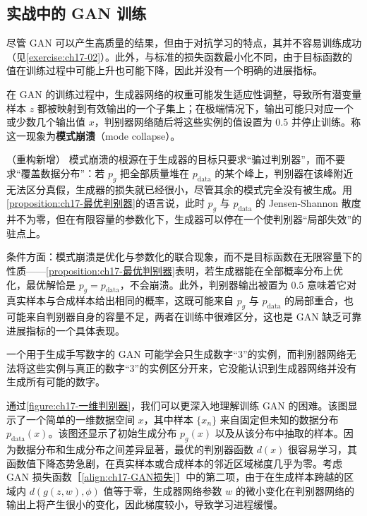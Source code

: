 \documentclass[../../main.tex]{subfiles}
\begin{document}
\subsection{实战中的 GAN 训练}\label{subsection:ch17-实战GAN训练}

尽管 GAN 可以产生高质量的结果，但由于对抗学习的特点，其并不容易训练成功（见\cref{exercise:ch17-02}）。此外，与标准的损失函数最小化不同，由于目标函数的值在训练过程中可能上升也可能下降，因此并没有一个明确的进展指标。

\begin{definition}[模式崩溃]\label{definition:ch17-模式崩溃}
在 GAN 的训练过程中，生成器网络的权重可能发生适应性调整，导致所有潜变量样本 $z$ 都被映射到有效输出的一个子集上；在极端情况下，输出可能只对应一个或少数几个输出值 $x$，判别器网络随后将这些实例的值设置为 $0.5$ 并停止训练。称这一现象为\textbf{模式崩溃}（mode collapse）。
\end{definition}

\begin{remark}（重构新增）
模式崩溃的根源在于生成器的目标只要求“骗过判别器”，而不要求“覆盖数据分布”：若 $p_g$ 把全部质量堆在 $p_{\mathrm{data}}$ 的某个峰上，判别器在该峰附近无法区分真假，生成器的损失就已经很小，尽管其余的模式完全没有被生成。用\cref{proposition:ch17-最优判别器}的语言说，此时 $p_g$ 与 $p_{\mathrm{data}}$ 的 Jensen-Shannon 散度并不为零，但在有限容量的参数化下，生成器可以停在一个使判别器“局部失效”的驻点上。

条件方面：模式崩溃是优化与参数化的联合现象，而不是目标函数在无限容量下的性质——\cref{proposition:ch17-最优判别器}表明，若生成器能在全部概率分布上优化，最优解恰是 $p_g=p_{\mathrm{data}}$，不会崩溃。此外，判别器输出被置为 $0.5$ 意味着它对真实样本与合成样本给出相同的概率，这既可能来自 $p_g$ 与 $p_{\mathrm{data}}$ 的局部重合，也可能来自判别器自身的容量不足，两者在训练中很难区分，这也是 GAN 缺乏可靠进展指标的一个具体表现。
\end{remark}

\begin{example}[ 手写数字生成中的模式崩溃]\label{example:ch17-模式崩溃}
一个用于生成手写数字的 GAN 可能学会只生成数字“3”的实例，而判别器网络无法将这些实例与真正的数字“3”的实例区分开来，它没能认识到生成器网络并没有生成所有可能的数字。
\end{example}

通过\cref{figure:ch17-一维判别器}，我们可以更深入地理解训练 GAN 的困难。该图显示了一个简单的一维数据空间 $x$，其中样本 $\{x_n\}$ 来自固定但未知的数据分布 $p_{\mathrm{data}}(x)$。该图还显示了初始生成分布 $p_g(x)$ 以及从该分布中抽取的样本。因为数据分布和生成分布之间差异显著，最优的判别器函数 $d(x)$ 很容易学习，其函数值下降态势急剧，在真实样本或合成样本的邻近区域梯度几乎为零。考虑 GAN 损失函数［\eqref{align:ch17-GAN损失}］中的第二项，由于在生成样本跨越的区域内 $d(g(z,w),\phi)$ 值等于零，生成器网络参数 $w$ 的微小变化在判别器网络的输出上将产生很小的变化，因此梯度较小，导致学习进程缓慢。
\end{document}
